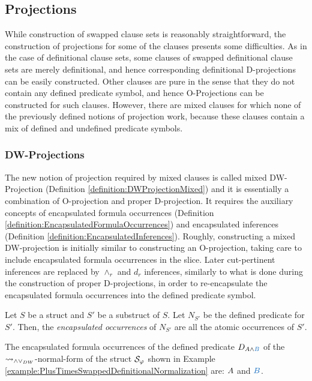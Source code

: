 \documentclass{llncs}
\begin{document}
\subsection{Projections}

While construction of swapped clause sets is reasonably straightforward, the construction of projections for some of the clauses presents some difficulties. As in the case of definitional clause sets, some clauses of swapped definitional clause sets are merely definitional, and hence corresponding definitional D-projections can be easily constructed. Other clauses are pure in the sense that they do not contain any defined predicate symbol, and hence O-Projections can be constructed for such clauses. However, there are mixed clauses for which none of the previously defined notions of projection work, because these clauses contain a mix of defined and undefined predicate symbols. 

\subsubsection{DW-Projections}

The new notion of projection required by mixed clauses is called mixed DW-Projection (Definition \ref{definition:DWProjectionMixed}) and it is essentially a combination of O-projection and proper D-projection. It requires the auxiliary concepts of encapsulated formula occurrences (Definition \ref{definition:EncapsulatedFormulaOccurrences}) and encapsulated inferences (Definition \ref{definition:EncapsulatedInferences}). Roughly, constructing a mixed DW-projection is initially similar to constructing an O-projection, taking care to include encapsulated formula occurrences in the slice. Later cut-pertinent inferences are replaced by $\wedge_r$ and $d_r$ inferences, similarly to what is done during the construction of proper D-projections, in order to re-encapsulate the encapsulated formula occurrences into the defined predicate symbol.

\begin{definition}
\label{definition:EncapsulatedFormulaOccurrences}
Let $S$ be a struct and $S'$ be a substruct of $S$. Let $N_{S'}$ be the defined predicate for $S'$. Then, the \emph{encapsulated occurrences} of $N_{S'}$ are all the atomic occurrences of $S'$.
\end{definition}

\begin{example}
\label{example:EncapsulatedFormulaOccurrences}


The encapsulated formula occurrences of the defined predicate $D_{\hA{A} \structplus \hB{B}}$ of the $\leadsto_{\wedge\vee_{DW}}$-normal-form of the struct $\mathcal{S}_{\varphi}$ shown in Example \ref{example:PlusTimesSwappedDefinitionalNormalization} are: $A$ and $\hB{B}$.
\end{example}
\end{document}
